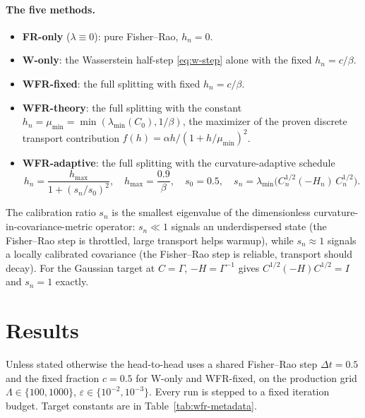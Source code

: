 \documentclass[11pt]{article}
\begin{document}
\paragraph{The five methods.}
\begin{itemize}
\item \textbf{FR-only} ($\lambda\equiv0$): pure Fisher--Rao, $h_n=0$.
\item \textbf{W-only}: the Wasserstein half-step \eqref{eq:w-step} alone with the
fixed $h_n=c/\beta$.
\item \textbf{WFR-fixed}: the full splitting with fixed $h_n=c/\beta$.
\item \textbf{WFR-theory}: the full splitting with the constant
$h_n=\mu_{\min}=\min(\lambda_{\min}(C_0),1/\beta)$, the maximizer of the proven
discrete transport contribution $f(h)=\alpha h/(1+h/\mu_{\min})^2$.
\item \textbf{WFR-adaptive}: the full splitting with the curvature-adaptive
schedule
\begin{equation}
\label{eq:adaptive}
h_n = \frac{h_{\max}}{1+(s_n/s_0)^2}, \quad
h_{\max}=\frac{0.9}{\beta}, \quad s_0=0.5, \quad
s_n = \lambda_{\min}\!\big(C_n^{1/2}(-H_n)\,C_n^{1/2}\big).
\end{equation}
\end{itemize}
The calibration ratio $s_n$ is the smallest eigenvalue of the dimensionless
curvature-in-covariance-metric operator: $s_n\ll1$ signals an underdispersed
state (the Fisher--Rao step is throttled, large transport helps warmup), while
$s_n\approx1$ signals a locally calibrated covariance (the Fisher--Rao step is
reliable, transport should decay). For the Gaussian target at $C=\Gamma$,
$-H=\Gamma^{-1}$ gives $C^{1/2}(-H)C^{1/2}=I$ and $s_n=1$ exactly.

\section{Results}
\label{sec:results}

Unless stated otherwise the head-to-head uses a shared Fisher--Rao step
$\Delta t=0.5$ and the fixed fraction $c=0.5$ for W-only and WFR-fixed, on the
production grid $\Lambda\in\{100,1000\}$, $\varepsilon\in\{10^{-2},10^{-3}\}$.
Every run is stepped to a fixed iteration budget. Target constants are in
Table~\ref{tab:wfr-metadata}.

\begin{table}[t]
\centering
\caption{Target metadata: strong-log-concavity $\alpha$, smoothness $\beta$,
condition number $\beta/\alpha$, initial covariance scale $\varepsilon$, and the
initial energy gap $\mathrm{gap}_0=\mathcal{E}(a_0)-\mathcal{E}(a_\star)$.}
\label{tab:wfr-metadata}
\end{table}
\end{document}
